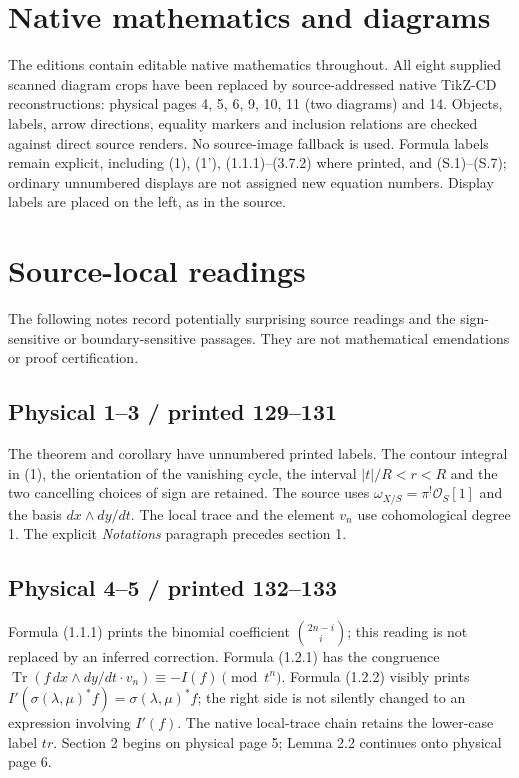\documentclass[11pt,leqno]{article}
\DeclareMathOperator{\Tr}{Tr}
\newcommand{\OO}{\mathcal O}
\begin{document}
\section*{Native mathematics and diagrams}
The editions contain editable native mathematics throughout. All eight supplied
scanned diagram crops have been replaced by source-addressed native TikZ-CD
reconstructions: physical pages 4, 5, 6, 9, 10, 11 (two diagrams) and 14.
Objects, labels, arrow directions, equality markers and inclusion relations are
checked against direct source renders. No source-image fallback is used.
Formula labels remain explicit, including (1), (1'), (1.1.1)--(3.7.2)
where printed, and (S.1)--(S.7); ordinary unnumbered displays are not assigned
new equation numbers. Display labels are placed on the left, as in the source.

\section*{Source-local readings}
The following notes record potentially surprising source readings and the
sign-sensitive or boundary-sensitive passages. They are not mathematical
emendations or proof certification.

\subsection*{Physical 1--3 / printed 129--131}
The theorem and corollary have unnumbered printed labels. The contour integral
in (1), the orientation of the vanishing cycle, the interval $|t|/R<r<R$ and
the two cancelling choices of sign are retained. The source uses
$\omega_{X/S}=\pi^!\OO_S[1]$ and the basis $dx\wedge dy/dt$. The local
trace and the element $v_n$ use cohomological degree 1. The explicit
\emph{Notations} paragraph precedes section 1.

\subsection*{Physical 4--5 / printed 132--133}
Formula (1.1.1) prints the binomial coefficient $\binom{2n-i}{i}$; this reading
is not replaced by an inferred correction. Formula (1.2.1) has the congruence
$\Tr(f\,dx\wedge dy/dt\cdot v_n)\equiv-I(f)\pmod{t^n}$.
Formula (1.2.2) visibly prints
$I'(\sigma(\lambda,\mu)^*f)=\sigma(\lambda,\mu)^*f$; the right side is
not silently changed to an expression involving $I'(f)$.
The native local-trace chain retains the lower-case label $tr$. Section 2
begins on physical page 5; Lemma 2.2 continues onto physical page 6.
\end{document}
